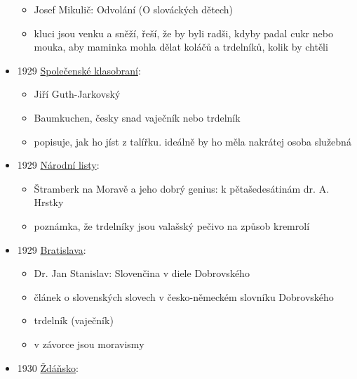 \begin{itemize}
  \begin{itemize}
  \tightlist
  \item
    Josef Mikulič: Odvolání (O slováckých dětech)
  \item
    kluci jsou venku a sněží, řeší, že by byli radši, kdyby padal cukr
    nebo mouka, aby maminka mohla dělat koláčů a trdelníků, kolik by
    chtěli
  \end{itemize}
\item
  1929
  \href{https://ceskadigitalniknihovna.cz/view/uuid:8eac0a2b-3229-4774-bc7b-59842402b9e4?page=uuid\%3Abd127f65-068f-11ee-8565-00155d01210b&source=svkhk}{Společenské
  klasobraní}:

  \begin{itemize}
  \tightlist
  \item
    Jiří Guth-Jarkovský
  \item
    Baumkuchen, česky snad vaječník nebo trdelník
  \item
    popisuje, jak ho jíst z talířku. ideálně by ho měla nakrátej osoba
    služebná
  \end{itemize}
\item
  1929
  \href{https://ceskadigitalniknihovna.cz/view/uuid:bf47407e-435d-11dd-b505-00145e5790ea?page=uuid\%3A2a4bcb83-435e-11dd-b505-00145e5790ea&fulltext=trdeln\%C3\%ADk\%20OR\%20trdeln\%C3\%ADky\%20OR\%20trdeln\%C3\%ADk\%C5\%AF&source=mzk}{Národní
  listy}:

  \begin{itemize}
  \tightlist
  \item
    Štramberk na Moravě a jeho dobrý genius: k pětašedesátinám dr. A.
    Hrstky
  \item
    poznámka, že trdelníky jsou valašský pečivo na způsob kremrolí
  \end{itemize}
\item
  1929
  \href{https://dikda.snk.sk/uuid/uuid:57ed0714-2a6c-433f-95a5-c0a9f19d2d1f}{Bratislava}:

  \begin{itemize}
  \tightlist
  \item
    Dr. Jan Stanislav: Slovenčina v diele Dobrovského
  \item
    článek o slovenských slovech v česko-německém slovníku Dobrovského
  \item
    trdelník (vaječník)
  \item
    v závorce jsou moravismy
  \end{itemize}
\item
  1930
  \href{https://ceskadigitalniknihovna.cz/view/uuid:e8387412-1c76-452f-9ecf-f705f1af03b3?page=uuid\%3Acd84eba0-525b-11e5-a788-0050569d679d&fulltext=trdeln\%C3\%ADk\%20OR\%20trdeln\%C3\%ADky\%20OR\%20trdeln\%C3\%ADk\%C5\%AF&source=mzk}{Ždáňsko}:


\end{itemize}
